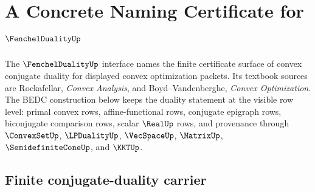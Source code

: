 \chapter{A Concrete Naming Certificate for $\FenchelDualityUp$}
\label{ch:concrete-instances-fenchelduality-namecert}

The $\FenchelDualityUp$ interface names the finite certificate surface of convex conjugate duality for displayed convex optimization packets. Its textbook sources are Rockafellar, \emph{Convex Analysis}, and Boyd--Vandenberghe, \emph{Convex Optimization}. The BEDC construction below keeps the duality statement at the visible row level: primal convex rows, affine-functional rows, conjugate epigraph rows, biconjugate comparison rows, scalar $\RealUp$ rows, and provenance through $\ConvexSetUp$, $\LPDualityUp$, $\VecSpaceUp$, $\MatrixUp$, $\SemidefiniteConeUp$, and $\KKTUp$.

\section{Finite conjugate-duality carrier}
\label{sec:fenchelduality-finite-carrier}

